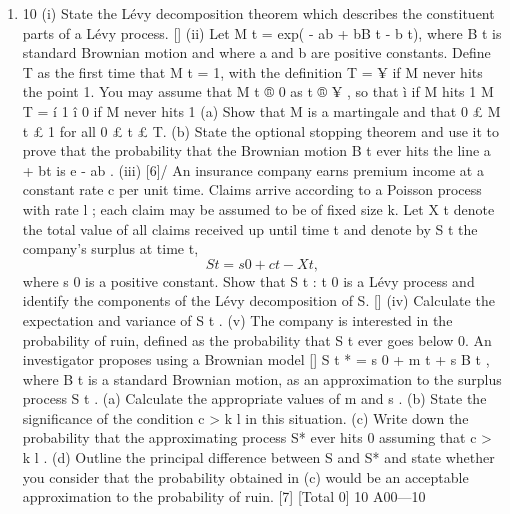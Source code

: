 \documentclass[a4paper,1pt]{article}
\begin{document}
\begin{enumerate}
\item


10
(i) State the Lévy decomposition theorem which describes the constituent parts of
a Lévy process.
[]
(ii) Let M t = exp( - ab + bB t - b  t), where B t is standard Brownian motion and
where a and b are positive constants. Define T as the first time that M t = 1,
with the definition T = ¥ if M never hits the point 1. You may assume that
M t ® 0 as t ® ¥ , so that
ì if M hits 1
M T = í 1
î 0 if M never hits 1
(a) Show that M is a martingale and that 0 £ M t £ 1 for all 0 £ t £ T.
(b) State the optional stopping theorem and use it to prove that the
probability that the Brownian motion B t ever hits the line a + bt is
e - ab .
(iii)
[6]/
An insurance company earns premium income at a constant rate c per unit
time. Claims arrive according to a Poisson process with rate l ; each claim
may be assumed to be of fixed size k. Let X t denote the total value of all
claims received up until time t and denote by S t the company’s surplus at
time t,
\[S t = s 0 + ct - X t ,\]
where s 0 is a positive constant. Show that {S t : t  0} is a Lévy process and
identify the components of the Lévy decomposition of S.
[]
(iv) Calculate the expectation and variance of S t .
(v) The company is interested in the probability of ruin, defined as the probability
that S t ever goes below 0. An investigator proposes using a Brownian model
[]
S t * = s 0 + m t + s B t ,
where B t is a standard Brownian motion, as an approximation to the surplus
process S t .
(a) Calculate the appropriate values of m and s .
(b) State the significance of the condition c > k l in this situation.
(c) Write down the probability that the approximating process S* ever hits
0 assuming that c > k l .
(d) Outline the principal difference between S and S* and state whether
you consider that the probability obtained in (c) would be an
acceptable approximation to the probability of ruin.
[7]
[Total 0]
10 A00—10


\end{enumerate}
\end{document}
